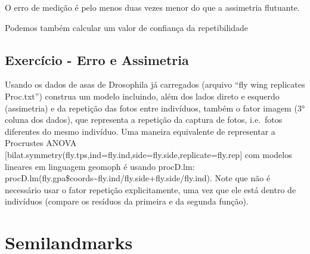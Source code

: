 \documentclass[
]{book}
\newenvironment{Shaded}{\begin{snugshade}}{\end{snugshade}}
\newcommand{\CommentTok}[1]{\textcolor[rgb]{0.56,0.35,0.01}{\textit{#1}}}
\newcommand{\DecValTok}[1]{\textcolor[rgb]{0.00,0.00,0.81}{#1}}
\newcommand{\NormalTok}[1]{#1}
\newcommand{\OtherTok}[1]{\textcolor[rgb]{0.56,0.35,0.01}{#1}}
\newcommand{\SpecialCharTok}[1]{\textcolor[rgb]{0.81,0.36,0.00}{\textbf{#1}}}
\begin{document}
O erro de medição é pelo menos duas vezes menor do que a assimetria flutuante.

Podemos também calcular um valor de confiança da repetibilidade

\begin{Shaded}
\end{Shaded}

\section{Exercício - Erro e Assimetria}\label{exercuxedcio---erro-e-assimetria}

Usando os dados de asas de Drosophila já carregados (arquivo ``fly wing replicates Proc.txt'') construa um modelo incluindo, além dos lados direto e esquerdo (assimetria) e da repetição das fotos entre indivíduos, também o fator imagem (3° coluna dos dados), que representa a repetição da captura de fotos, i.e.~fotos diferentes do mesmo indivíduo. Uma maneira equivalente de representar a Procrustes ANOVA {[}bilat.symmetry(fly.tps,ind=fly.ind,side=fly.side,replicate=fly.rep{]} com modelos lineares em linguagem geomoph é usando procD.lm: procD.lm(fly.gpa\$coords\textasciitilde fly.ind/fly.side+fly.side/fly.ind). Note que não é necessário usar o fator repetição explicitamente, uma vez que ele está dentro de indivíduos (compare os resíduos da primeira e da segunda função).

\chapter{Semilandmarks}\label{semilandmarks}
\end{document}
